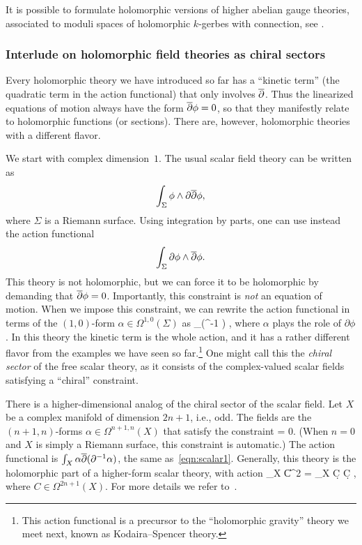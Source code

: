 \documentclass[11pt]{amsart}
\renewcommand{\op}{\operatorname}
\begin{document}
It is possible to formulate holomorphic versions of higher abelian gauge theories,
associated to moduli spaces of holomorphic $k$-gerbes with connection, see \cite{SWtensor,BWfive}.

\subsubsection{Interlude on holomorphic field theories as chiral sectors}

Every holomorphic theory we have introduced so far has a ``kinetic term'' (the quadratic term in the action functional) that only involves ${\overline{\partial}}$.
Thus the linearized equations of motion always have the form ${\overline{\partial}} \phi = 0$,
so that they manifestly relate to holomorphic functions (or sections).
There are, however, holomorphic theories with a different flavor.

\begin{comment}
A typical scalar field theory is the free boson which exists on any Riemannian manifold $\Sigma$.
Its action functional is simply $\int_\Sigma \phi \triangle \phi$ where $\phi$ is a smooth function on $\Sigma$.
We saved this example for last since its holomorphic analog is a bit more elusive than the previous examples.
\end{comment}

We start with complex dimension~$1$.
The usual scalar field theory can be written as 
\[
\int_{\Sigma} \phi \wedge \partial {\overline{\partial}} \phi, 
\]
where $\Sigma$ is a Riemann surface.
Using integration by parts, one can use instead the action functional
\[
\int_{\Sigma} \partial \phi \wedge {\overline{\partial}} \phi.
\]
This theory is not holomorphic, but we can force it to be holomorphic by demanding that ${\overline{\partial}} \phi = 0$.
Importantly, this constraint is \textit{not} an equation of motion.
When we impose this constraint, we can rewrite the action functional in terms of the $(1,0)$-form $\alpha \in \Omega^{1,0}(\Sigma)$ as
\beqn\label{eqn:scalar1}
\int_\Sigma \alpha \wedge \dbar (\del^{-1} \alpha) ,
\eeqn
where $\alpha$ plays the role of $\partial \phi$.
In this theory the kinetic term is the whole action,
and it has a rather different flavor from the examples we have seen so far.\footnote{This action functional is a precursor to the ``holomorphic gravity'' theory we meet next, 
known as Kodaira--Spencer theory.}
One might call this the {\em chiral sector} of the free scalar theory,
as it consists of the complex-valued scalar fields satisfying a ``chiral'' constraint.

There is a higher-dimensional analog of the chiral sector of the scalar field.
Let $X$ be a complex manifold of dimension $2n+1$, i.e., odd.
The fields are the $(n+1,n)$-forms $\alpha \in \Omega^{n+1,n}(X)$ that satisfy the constraint
\beqn
\del \alpha = 0.
\eeqn
(When $n=0$ and $X$ is simply a Riemann surface, 
this constraint is automatic.)
The action functional is $\int_X \alpha {\overline{\partial}}(\partial^{-1} \alpha)$, the same as~\eqref{eqn:scalar1}.
Generally, this theory is the holomorphic part of a higher-form scalar theory, with action
\beqn
\int_X \|C\|^2 \op{dvol} = \int_X \d C \wedge \star \d C , 
\eeqn
where $C \in \Omega^{2n+1}(X)$.
For more details we refer to~\cite{GRW_WZW}.
\end{document}
